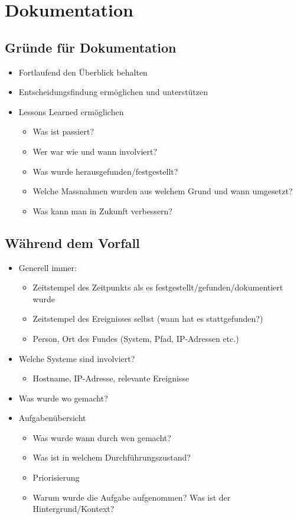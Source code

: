 \section{Dokumentation}

\subsection{Gründe für Dokumentation}
\begin{itemize}
    \item Fortlaufend den Überblick behalten
    \item Entscheidungsfindung ermöglichen und unterstützen
    \item Lessons Learned ermöglichen
    \begin{itemize}
        \item Was ist passiert?
        \item Wer war wie und wann involviert?
        \item Was wurde herausgefunden/festgestellt?
        \item Welche Massnahmen wurden aus welchem Grund und wann umgesetzt?
        \item Was kann man in Zukunft verbessern?
    \end{itemize}
\end{itemize}

\subsection{Während dem Vorfall}
\begin{itemize}
    \item Generell immer:
    \begin{itemize}
        \item Zeitstempel des Zeitpunkts als es festgestellt/gefunden/dokumentiert wurde
        \item Zeitstempel des Ereignisses selbst (wann hat es stattgefunden?)
        \item Person, Ort des Fundes (System, Pfad, IP-Adressen etc.)
    \end{itemize}
    \item Welche Systeme sind involviert?
    \begin{itemize}
        \item Hostname, IP-Adresse, relevante Ereignisse
    \end{itemize}
    \item Was wurde wo gemacht?
    \item Aufgabenübersicht
    \begin{itemize}
        \item Was wurde wann durch wen gemacht?
        \item Was ist in welchem Durchführungszustand?
        \item Priorisierung
        \item Warum wurde die Aufgabe aufgenommen? Was ist der Hintergrund/Kontext?
    \end{itemize}
\end{itemize}

